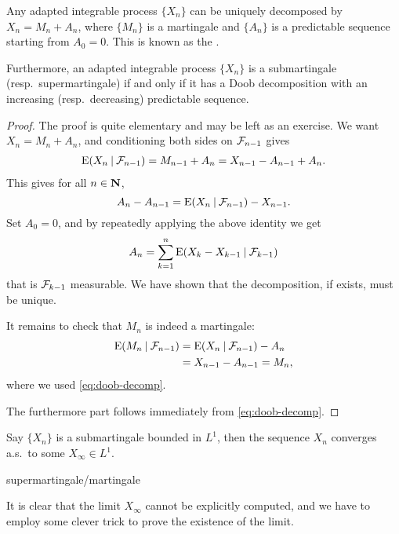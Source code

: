 \begin{namedthm} \label{thm:doob-decomp}
    Any adapted integrable process $\{X_n\}$ can be uniquely decomposed by $X_n = M_n + A_n$, where $\{M_n\}$ is a martingale and $\{A_n\}$ is a predictable sequence starting from $A_0 = 0$. This is known as the .

    Furthermore, an adapted integrable process $\{X_n\}$ is a submartingale (resp.\ supermartingale) if and only if it has a Doob decomposition with an increasing (resp.\ decreasing) predictable sequence.
\end{namedthm}
\begin{proof}
    The proof is quite elementary and may be left as an exercise. We want $X_n = M_n + A_n$, and conditioning both sides on $\mathcal{F}_{n-1}$ gives \begin{align*}
        \mathop{}\!\mathrm{E}(X_n \mathbin{|} \mathcal{F}_{n-1}) = M_{n-1} + A_n = X_{n-1} - A_{n-1} + A_n.
    \end{align*}
    This gives for all $n\in \mathbf{N}$, \begin{equation}
        A_n - A_{n-1} = \E(X_n \giv \F_{n-1}) - X_{n-1}. \label{eq:doob-decomp}
    \end{equation} Set $A_0 = 0$, and by repeatedly applying the above identity we get \[
        A_n = \sum_{k=1}^n \mathop{}\!\mathrm{E}(X_k - X_{k-1} \mathbin{|} \mathcal{F}_{k-1}) 
    \] that is $\mathcal{F}_{k-1}$ measurable. We have shown that the decomposition, if exists, must be unique.
    
    It remains to check that $M_n$ is indeed a martingale: \begin{align*}
        \mathop{}\!\mathrm{E}(M_n \mathbin{|} \mathcal{F}_{n-1}) & = \mathop{}\!\mathrm{E}(X_n \mathbin{|} \mathcal{F}_{n-1}) - A_n \\
            & = X_{n-1} - A_{n-1} = M_n,
    \end{align*} where we used \eqref{eq:doob-decomp}.

    The furthermore part follows immediately from \eqref{eq:doob-decomp}.
\end{proof}

\begin{namedthm} \label{thm:martingale-conv-thm}
    Say $\{X_n\}$ is a submartingale bounded in $L^1$, then the sequence $X_n$ converges a.s.\ to some $X_\infty \in L^1$.

    supermartingale/martingale 
\end{namedthm}

It is clear that the limit $X_\infty$ cannot be explicitly computed, and we have to employ some clever trick to prove the existence of the limit. 

